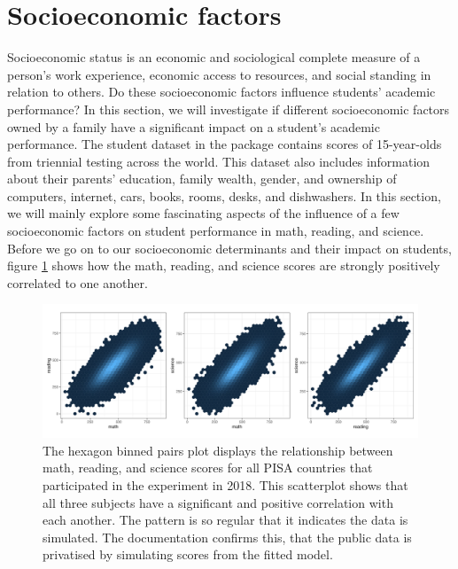 \hypertarget{socioeconomic-factors}{%
\section{Socioeconomic factors}\label{socioeconomic-factors}}

Socioeconomic status is an economic and sociological complete measure of a person's work experience, economic access to resources, and social standing in relation to others. Do these socioeconomic factors influence students' academic performance? In this section, we will investigate if different socioeconomic factors owned by a family have a significant impact on a student's academic performance. The student dataset in the  package contains scores of 15-year-olds from triennial testing across the world. This dataset also includes information about their parents' education, family wealth, gender, and ownership of computers, internet, cars, books, rooms, desks, and dishwashers. In this section, we will mainly explore some fascinating aspects of the influence of a few socioeconomic factors on student performance in math, reading, and science. Before we go on to our socioeconomic determinants and their impact on students, figure \ref{fig:corr-plot} shows how the math, reading, and science scores are strongly positively correlated to one another.

\begin{figure}[H]
\includegraphics[width=1\linewidth]{figures/hexbin} \caption{The hexagon binned pairs plot displays the relationship between math, reading, and science scores for all PISA countries that participated in the experiment in 2018. This scatterplot shows that all three subjects have a significant and positive correlation with each another. The pattern is so regular that it indicates the data is simulated. The documentation confirms this, that the public data is privatised by simulating scores from the fitted model.}\label{fig:corr-plot}
\end{figure}

